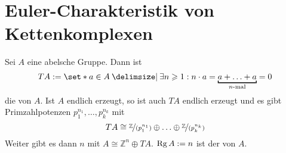 \newpage

\section{Euler-Charakteristik von Kettenkomplexen} %
\label{sec:4}

\begin{erinnerungA}[{name=[Torsionsgruppe]}]
	Sei $A$ eine abelsche Gruppe. Dann ist 
	\[
		T A := \set*{a \in A \given \exists n \ge 1 : n \cdot a = \underbracket[1pt][2pt]{a + \ldots + a}_{\text{$n$-mal}} = 0} 
	\]
	die  von $A$. Ist $A$ endlich erzeugt, so ist auch $TA$ endlich erzeugt und es gibt Primzahlpotenzen $p_1^{n_1}, \ldots , p_k^{n_k}$ mit
	\[
		TA \cong \nicefrac{\mathbb{Z}}{(p_1^{n_1})} \oplus \ldots \oplus \nicefrac{\mathbb{Z}}{(p_k^{n_k})}
	\]
	Weiter gibt es dann $n$ mit $A \cong \mathbb{Z}^n \oplus TA$. $\operatorname{Rg} A := n$ ist der  von $A$.
\end{erinnerungA}

